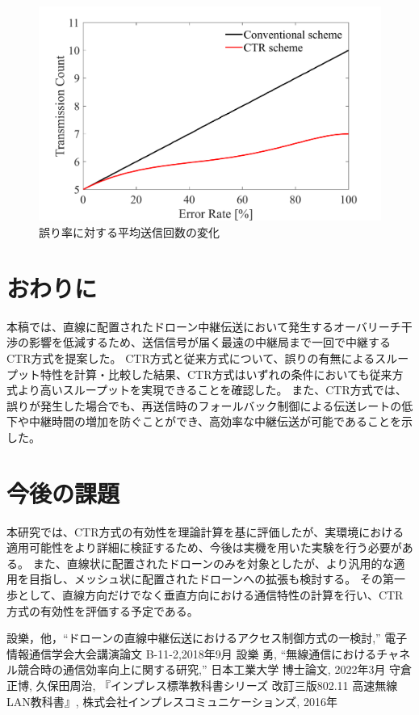 \documentclass[a4paper,10.5pt]{ltjsarticle}
\begin{document}
\begin{figure}[H]
  \centering
  \includegraphics[width=\linewidth]{throughput_probabilistic_retry_v3.1.pdf} %
  \caption{誤り率に対する平均送信回数の変化}
  \label{fig:throughput_v3.1} %
\end{figure}

\clearpage
\section{おわりに}
本稿では、直線に配置されたドローン中継伝送において発生するオーバリーチ干渉の影響を低減するため、送信信号が届く最遠の中継局まで一回で中継するCTR方式を提案した。
CTR方式と従来方式について、誤りの有無によるスループット特性を計算・比較した結果、CTR方式はいずれの条件においても従来方式より高いスループットを実現できることを確認した。
また、CTR方式では、誤りが発生した場合でも、再送信時のフォールバック制御による伝送レートの低下や中継時間の増加を防ぐことができ、高効率な中継伝送が可能であることを示した。
\clearpage
\section{今後の課題}
本研究では、CTR方式の有効性を理論計算を基に評価したが、実環境における適用可能性をより詳細に検証するため、今後は実機を用いた実験を行う必要がある。
また、直線状に配置されたドローンのみを対象としたが、より汎用的な適用を目指し、メッシュ状に配置されたドローンへの拡張も検討する。
その第一歩として、直線方向だけでなく垂直方向における通信特性の計算を行い、CTR方式の有効性を評価する予定である。


\clearpage
\begin{thebibliography}{99}
  設樂，他，“ドローンの直線中継伝送におけるアクセス制御方式の一検討,” 電子情報通信学会大会講演論文 B-11-2,2018年9月
  設樂 勇, “無線通信におけるチャネル競合時の通信効率向上に関する研究,” 日本工業大学 博士論文, 2022年3月
  守倉正博, 久保田周治, 『インプレス標準教科書シリーズ 改訂三版802.11 高速無線LAN教科書』, 株式会社インプレスコミュニケーションズ, 2016年
\end{thebibliography}
\end{document}
